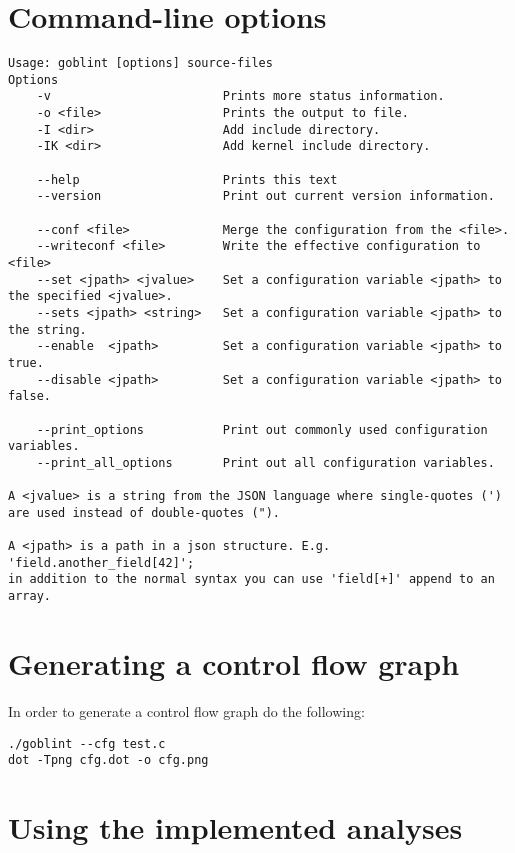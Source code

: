 \section{Command-line options}
\begin{lstlisting}
Usage: goblint [options] source-files
Options
    -v                        Prints more status information.                 
    -o <file>                 Prints the output to file.                      
    -I <dir>                  Add include directory.                          
    -IK <dir>                 Add kernel include directory.                   

    --help                    Prints this text                                
    --version                 Print out current version information.          

    --conf <file>             Merge the configuration from the <file>.        
    --writeconf <file>        Write the effective configuration to <file>     
    --set <jpath> <jvalue>    Set a configuration variable <jpath> to the specified <jvalue>.
    --sets <jpath> <string>   Set a configuration variable <jpath> to the string.
    --enable  <jpath>         Set a configuration variable <jpath> to true.   
    --disable <jpath>         Set a configuration variable <jpath> to false.  

    --print_options           Print out commonly used configuration variables.
    --print_all_options       Print out all configuration variables.          

A <jvalue> is a string from the JSON language where single-quotes (') are used instead of double-quotes (").

A <jpath> is a path in a json structure. E.g. 'field.another_field[42]';
in addition to the normal syntax you can use 'field[+]' append to an array.
\end{lstlisting}


\section{Generating a control flow graph}
In order to generate a control flow graph do the following:
\begin{lstlisting}
./goblint --cfg test.c
dot -Tpng cfg.dot -o cfg.png 
\end{lstlisting}


\section{Using the implemented analyses}
\label{sec:app:use_ana}
